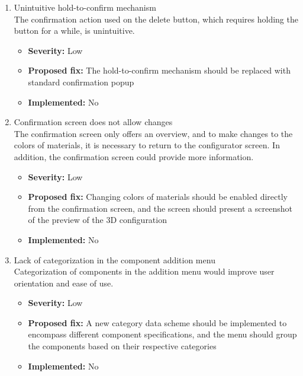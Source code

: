 \begin{enumerate}[label=\textbf{I\arabic*:}, leftmargin=*]
    \item Unintuitive hold-to-confirm mechanism
        \vspace{2pt}
        \\The confirmation action used on the delete button, which requires holding the button for a while, is unintuitive.
        \begin{itemize}[noitemsep, label=\trianglebullet]
            \item \textbf{Severity:} Low
            \item \textbf{Proposed fix:} The hold-to-confirm mechanism should be replaced with standard confirmation popup
            \item \textbf{Implemented:} No
        \end{itemize}
        \vspace{4pt}

    \item Confirmation screen does not allow changes
        \vspace{2pt}
        \\The confirmation screen only offers an overview, and to make changes to the colors of materials, it is necessary to return to the configurator screen. In addition, the confirmation screen could provide more information.
        \begin{itemize}[noitemsep, label=\trianglebullet]
            \item \textbf{Severity:} Low
            \item \textbf{Proposed fix:} Changing colors of materials should be enabled directly from the confirmation screen, and the screen should present a screenshot of the preview of the 3D configuration
            \item \textbf{Implemented:} No
        \end{itemize}
        \vspace{4pt}

    \item Lack of categorization in the component addition menu
        \vspace{2pt}
        \\Categorization of components in the addition menu would improve user orientation and ease of use.
        \begin{itemize}[noitemsep, label=\trianglebullet]
            \item \textbf{Severity:} Low
            \item \textbf{Proposed fix:} A new category data scheme should be implemented to encompass different component specifications, and the menu should group the components based on their respective categories
            \item \textbf{Implemented:} No
        \end{itemize}
        \vspace{4pt}


\end{enumerate}

